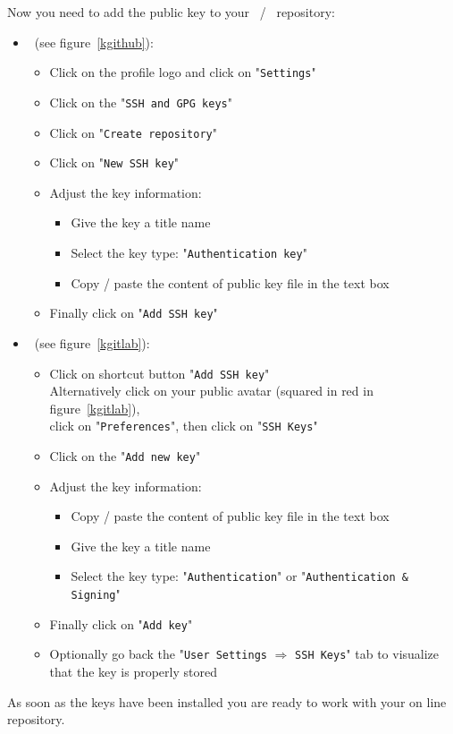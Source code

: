 Now you need to add the public key to your \github\ / \gitlab\ repository: 
\begin{itemize}
\item \github\ (see figure~\ref{kgithub}):
\begin{itemize}
\item Click on the profile logo and click on "\texttt{Settings}"
\item Click on the "\texttt{SSH and GPG keys}"
\item Click on "\texttt{Create repository}"
\item Click on "\texttt{New SSH key}"
\item Adjust the key information:
\begin{itemize}
\item Give the key a title name
\item Select the key type: "\texttt{Authentication key}" 
\item Copy / paste the content of public key file in the text box
\end{itemize}
\item Finally click on "\texttt{Add SSH key}"
\end{itemize}
\item \gitlab\ (see figure~\ref{kgitlab}):
\begin{itemize}
\item Click on shortcut button "\texttt{Add SSH key}" \\
Alternatively click on your public avatar (squared in red in figure~\ref{kgitlab}), \\
click on "\texttt{Preferences}", then click on "\texttt{SSH Keys}"
\item Click on the "\texttt{Add new key}"
\item Adjust the key information:
\begin{itemize}
\item Copy / paste the content of public key file in the text box
\item Give the key a title name
\item Select the key type: "\texttt{Authentication}" or "\texttt{Authentication \& Signing}" 
\end{itemize}
\item Finally click on "\texttt{Add key}"
\item Optionally go back the "\texttt{User Settings} $\Longrightarrow$ \texttt{SSH Keys}" tab to visualize that the key is properly stored
\end{itemize}
\end{itemize}
As soon as the keys have been installed you are ready to work with your on line repository. 

